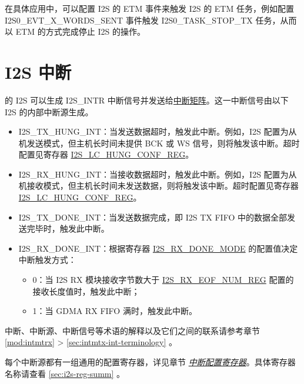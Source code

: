 \documentclass[main\_\_CN.tex]{subfiles}
\begin{document}
在具体应用中，可以配置 I2S 的 ETM 事件来触发 I2S 的 ETM 任务，例如配置 I2S0\_EVT\_X\_WORDS\_SENT 事件触发 I2S0\_TASK\_STOP\_TX 任务，从而以 ETM 的方式完成停止 I2S 的操作。



\section{I2S 中断} \label{sec:i2s-interrupts}

\chipname{} 的 I2S 可以生成 I2S\_INTR 中断信号并发送给\hyperref[mod:intmtrx]{中断矩阵}。这一中断信号由以下 I2S 的内部中断源生成。

\begin{itemize}
\item \label{int:I2STXHUNGINT}I2S\_TX\_HUNG\_INT：当发送数据超时，触发此中断。例如，I2S 配置为从机发送模式，但主机长时间未提供 BCK 或 WS 信号，则将触发该中断。超时配置见寄存器 \hyperref[regdesc:I2SLCHUNGCONFREG]{I2S\_LC\_HUNG\_CONF\_REG}。

\item \label{int:I2SRXHUNGINT}I2S\_RX\_HUNG\_INT：当接收数据超时，触发此中断。例如，I2S 配置为从机接收模式，但主机长时间未发送数据，则将触发该中断。超时配置见寄存器 \hyperref[regdesc:I2SLCHUNGCONFREG]{I2S\_LC\_HUNG\_CONF\_REG}。
\item \label{int:I2STXDONEINT}I2S\_TX\_DONE\_INT：当发送数据完成，即 I2S TX FIFO 中的数据全部发送完毕时，触发此中断。
\item \label{int:I2SRXDONEINT}I2S\_RX\_DONE\_INT：根据寄存器 \hyperref[fielddesc:I2SRXDONEMODE]{I2S\_RX\_DONE\_MODE} 的配置值决定中断触发方式：
    \begin{itemize}
        \item 0：当 I2S RX 模块接收字节数大于 \hyperref[regdesc:I2SRXEOFNUMREG]{I2S\_RX\_EOF\_NUM\_REG} 配置的接收长度值时，触发此中断；
        \item 1：当 GDMA RX FIFO 满时，触发此中断。
    \end{itemize}
\end{itemize}

\begin{tiplisting}
中断、中断源、中断信号等术语的解释以及它们之间的联系请参考章节 \ref{mod:intmtrx} \textit{} > \ref{sec:intmtx-int-terminology} \textit{}。
\end{tiplisting}

每个中断源都有一组通用的配置寄存器，详见章节 \hyperref[interrupt-config-registers]{\textit{中断配置寄存器}}。具体寄存器名称请查看 \ref{sec:i2s-reg-summ} \textit{}。
\end{document}
